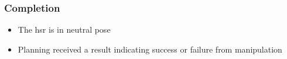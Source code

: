 \documentclass[main.tex]{subfiles}
\begin{document}
	\subsubsection{Completion}
	\begin{itemize}
		\item The hsr is in neutral pose
		\item Planning received a result indicating success or failure from manipulation				
	\end{itemize}
	
\end{document}
